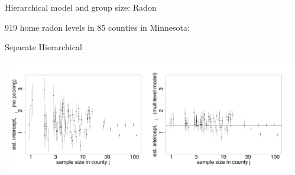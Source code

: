 \documentclass[finnish,english,t]{beamer}
\begin{document}
\begin{frame}{Hierarchical model and group size: Radon}

  919 home radon levels in 85 counties in Minnesota:
  
    \hspace{0.2cm} Separate \hspace{4.3cm} Hierarchical
  \begin{minipage}[b]{12cm}
    {  \hspace{-0.9cm}~\includegraphics[width=6.3cm]{radon2.pdf}\includegraphics[width=6.3cm]{radon4.pdf}}
  \end{minipage}
  
\end{frame}
\end{document}
